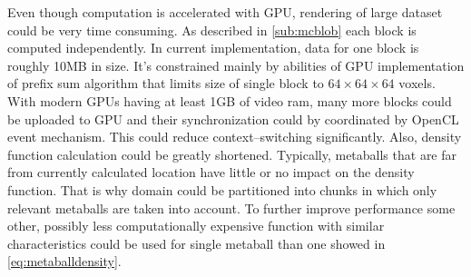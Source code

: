 Even though computation is accelerated with GPU, rendering of large dataset could
be very time consuming. As described in \autoref{sub:mcblob} each block is
computed independently. In current implementation, data for one block
is roughly 10MB in size. It's constrained mainly by abilities of GPU implementation
of prefix sum algorithm that limits size of single block to $64\times 64\times 64$
voxels. With modern GPUs having at least 1GB of video ram, many more blocks
could be uploaded to GPU and their synchronization could by coordinated by
OpenCL event mechanism. This could reduce context--switching significantly.
Also, density function calculation could be greatly shortened. Typically,
metaballs that are far from currently calculated location have little or no
impact on the density function. That is why domain could be partitioned into chunks
in which only relevant metaballs are taken into account. To further improve
performance some other, possibly less computationally expensive function with
similar characteristics could be used for single metaball than one showed in
\autoref{eq:metaballdensity}.

